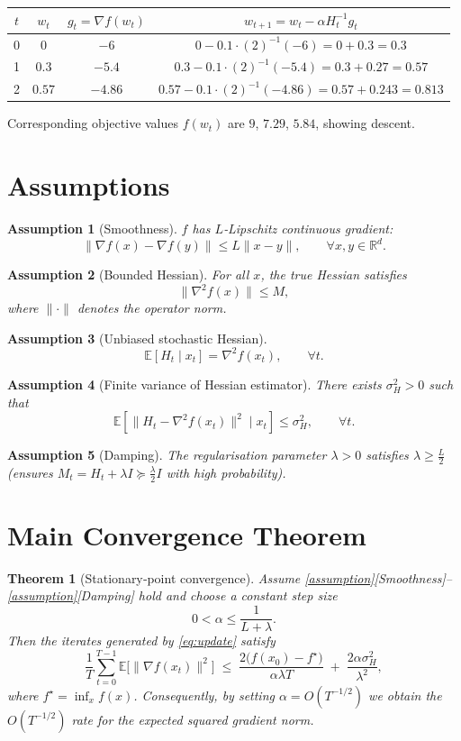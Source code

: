 \documentclass{article}
\newtheorem{theorem}{Theorem}
\newtheorem{assumption}{Assumption}
\newcommand{\E}{\mathbb{E}}
\newcommand{\R}{\mathbb{R}}
\begin{document}
\begin{center}
\begin{tabular}{c|c|c|c}
$t$ & $w_{t}$ & $g_{t}= \nabla f(w_{t})$ & $w_{t+1}=w_{t}-\alpha H_{t}^{-1}g_{t}$ \\ \hline
0 & $0$ & $-6$ & $0-0.1\cdot(2)^{-1}(-6)=0+0.3=0.3$ \\
1 & $0.3$ & $-5.4$ & $0.3-0.1\cdot(2)^{-1}(-5.4)=0.3+0.27=0.57$ \\
2 & $0.57$ & $-4.86$ & $0.57-0.1\cdot(2)^{-1}(-4.86)=0.57+0.243=0.813$ \\
\end{tabular}
\end{center}
Corresponding objective values $f(w_{t})$ are $9$, $7.29$, $5.84$, showing descent.

\section*{Assumptions}
\begin{assumption}[Smoothness]
$f$ has $L$‑Lipschitz continuous gradient:
\[
\|\nabla f(x)-\nabla f(y)\|\le L\|x-y\|,\qquad\forall x,y\in\R^{d}.
\]
\end{assumption}
\begin{assumption}[Bounded Hessian]
For all $x$, the true Hessian satisfies
\[
\|\nabla^{2} f(x)\|\le M,
\]
where $\|\cdot\|$ denotes the operator norm.
\end{assumption}
\begin{assumption}[Unbiased stochastic Hessian]
\[
\E[H_{t}\mid x_{t}]=\nabla^{2} f(x_{t}),\qquad\forall t.
\]
\end{assumption}
\begin{assumption}[Finite variance of Hessian estimator]
There exists $\sigma_{H}^{2}>0$ such that
\[
\E\!\left[\|H_{t}-\nabla^{2} f(x_{t})\|^{2}\mid x_{t}\right]\le\sigma_{H}^{2},\qquad\forall t.
\]
\end{assumption}
\begin{assumption}[Damping]
The regularisation parameter $\lambda>0$ satisfies $\lambda\ge \frac{L}{2}$ (ensures $M_{t}=H_{t}+\lambda I\succeq \frac{\lambda}{2}I$ with high probability).
\end{assumption}

\section*{Main Convergence Theorem}
\begin{theorem}[Stationary‑point convergence]\label{thm:main}
Assume \ref{assumption}[Smoothness]–\ref{assumption}[Damping] hold and choose a constant step size
\[
0<\alpha\le \frac{1}{L+\lambda}.
\]
Then the iterates generated by \eqref{eq:update} satisfy
\[
\frac{1}{T}\sum_{t=0}^{T-1}\E\bigl[\|\nabla f(x_{t})\|^{2}\bigr]\;\le\;
\frac{2\bigl(f(x_{0})-f^{\star}\bigr)}{\alpha\lambda T}
\;+\;
\frac{2\alpha\sigma_{H}^{2}}{\lambda^{2}},
\tag{1}
\]
where $f^{\star}=\inf_{x}f(x)$. Consequently, by setting $\alpha=O(T^{-1/2})$ we obtain the $O(T^{-1/2})$ rate for the expected squared gradient norm.
\end{theorem}
\end{document}
